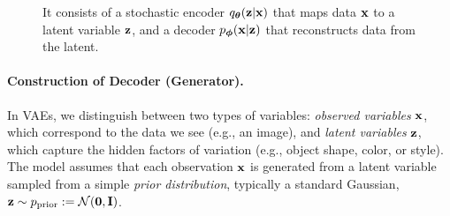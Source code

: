 \begin{figure}[tbh!]
{}
\caption{ It consists of a stochastic encoder $q_{\bm{\theta}}({\mathbf{z}}|{\mathbf{x}})$ that maps data ${\mathbf{x}}$ to a latent variable ${\mathbf{z}}$, and a decoder $p_{\bm{\phi}}({\mathbf{x}}|{\mathbf{z}})$ that reconstructs data from the latent. }
\label{fig:vae-graph}
\end{figure}

\paragraph{Construction of Decoder (Generator).}



In VAEs, we distinguish between two types of variables: 
\emph{observed variables} ${\mathbf{x}}$, which correspond to the data we see (e.g., an image), 
and \emph{latent variables} ${\mathbf{z}}$, which capture the hidden factors of variation 
(e.g., object shape, color, or style). 
The model assumes that each observation ${\mathbf{x}}$ is generated from a latent variable 
sampled from a simple \emph{prior distribution}, typically a standard Gaussian, 
${\mathbf{z}} \sim p_{\text{prior}} := \mathcal{N}(\mathbf{0}, \mathbf{I})$.

